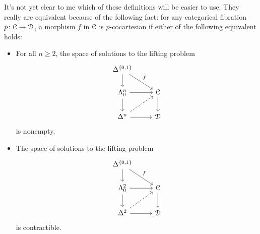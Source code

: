 \documentclass[main.tex]{subfiles}
\begin{document}
\begin{definition}
  \begin{note}
    It's not yet clear to me which of these definitions will be easier to use. They really are equivalent because of the following fact: for any categorical fibration $p\colon \mathcal{C} \to \mathcal{D}$, a morphism $f$ in $\mathcal{C}$ is $p$-cocartesian if either of the following equivalent holds:
    \begin{itemize}
      \item For all $n \geq 2$, the space of solutions to the lifting problem
        \begin{equation*}
          \begin{tikzcd}
            \Delta^{\{0, 1\}}
            \arrow[dr, "f"]
            \arrow[d]
            \\
            \Lambda^{n}_{0}
            \arrow[r]
            \arrow[d]
            & \category{C}
            \arrow[d]
            \\
            \Delta^{n}
            \arrow[r]
            \arrow[ur, dashed]
            & \category{D}
          \end{tikzcd}
        \end{equation*}
        is nonempty.

      \item The space of solutions to the lifting problem
        \begin{equation*}
          \begin{tikzcd}
            \Delta^{\{0, 1\}}
            \arrow[rd, "f"]
            \arrow[d]
            \\
            \Lambda^{2}_{0}
            \arrow[r]
            \arrow[d]
            & \category{C}
            \arrow[d]
            \\
            \Delta^{2}
            \arrow[r]
            \arrow[ur, dashed]
            & \category{D}
          \end{tikzcd}
        \end{equation*}
        is contractible.
    \end{itemize}
  \end{note}


\end{definition}
\end{document}
